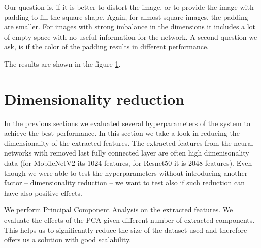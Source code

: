Our question is, if it is better to distort the image, or to provide the image with padding to fill the square shape. Again, for almost square images, the padding are smaller. For images with strong imbalance in the dimensions it includes a lot of empty space with no useful information for the network. A second question we ask, is if the color of the padding results in different performance.

The results are shown in the figure \ref{}\todo{}.

\section{Dimensionality reduction}

In the previous sections we evaluated several hyperparameters of the system to achieve the best performance. In this section we take a look in reducing the dimensionality of the extracted features. The extracted features from the neural networks with removed last fully connected layer are often high dimenisonality data (for MobileNetV2 its 1024 features, for Resnet50 it is 2048 features). Even though we were able to test the hyperparameters without introducing another factor -- dimensionality reduction -- we want to test also if such reduction can have also positive effects.


We perform Principal Component Analysis on the extracted features. We evaluate the effects of the PCA given different number of extracted components. This helps us to significantly reduce the size of the dataset used and therefore offers us a solution with good scalability.

